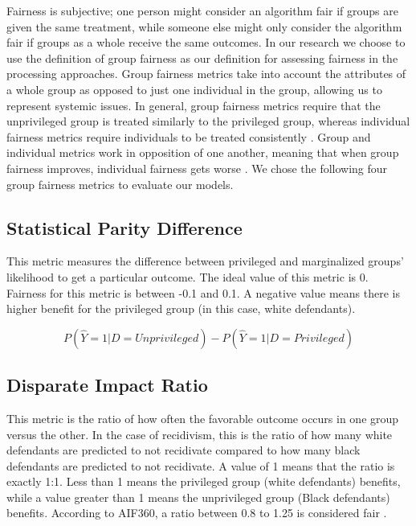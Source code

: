 \documentclass[,article,,moreauthors,pdftex]{mdpi}
\begin{document}
Fairness is subjective; one person might consider an algorithm fair if
groups are given the same treatment, while someone else might only
consider the algorithm fair if groups as a whole receive the same
outcomes. In our research we choose to use the definition of group
fairness as our definition for assessing fairness in the processing
approaches. Group fairness metrics take into account the attributes of a
whole group as opposed to just one individual in the group, allowing us
to represent systemic issues. In general, group fairness metrics require
that the unprivileged group is treated similarly to the privileged
group, whereas individual fairness metrics require individuals to be
treated consistently \citep{kypraiou_what_2021}. Group and individual
metrics work in opposition of one another, meaning that when group
fairness improves, individual fairness gets worse
\citep{kypraiou_what_2021}. We chose the following four group fairness
metrics to evaluate our models.

\hypertarget{statistical-parity-difference}{%
\subsection{Statistical Parity
Difference}\label{statistical-parity-difference}}

This metric measures the difference between privileged and marginalized
groups' likelihood to get a particular outcome. The ideal value of this
metric is 0. Fairness for this metric is between -0.1 and 0.1. A
negative value means there is higher benefit for the privileged group
(in this case, white defendants).

\[P(\hat{Y}=1|D=Unprivileged) - P(\hat{Y}=1|D=Privileged)\]

\hypertarget{disparate-impact-ratio}{%
\subsection{Disparate Impact Ratio}\label{disparate-impact-ratio}}

This metric is the ratio of how often the favorable outcome occurs in
one group versus the other. In the case of recidivism, this is the ratio
of how many white defendants are predicted to not recidivate compared to
how many black defendants are predicted to not recidivate. A value of 1
means that the ratio is exactly 1:1. Less than 1 means the privileged
group (white defendants) benefits, while a value greater than 1 means
the unprivileged group (Black defendants) benefits. According to AIF360,
a ratio between 0.8 to 1.25 is considered fair \citep{Ronaghan2019AI}.
\end{document}
